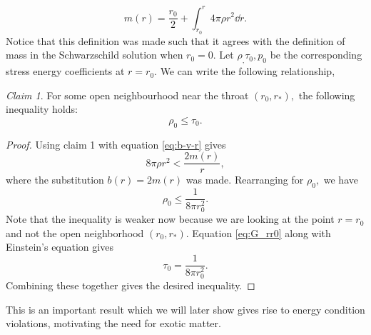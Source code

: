 \documentclass[%
 reprint,
 amsmath,amssymb
 aps,
]{revtex4}
\theoremstyle{remark}
\newtheorem{claim}{Claim}
\begin{document}
\begin{equation}
    m(r) = \frac{r_0}{2} + \int_{r_0}^r 4\pi \rho r^2 \dd{r}.
\end{equation}
Notice that this definition was made such that it agrees with the definition of mass in the Schwarzschild solution when $r_0 = 0.$ Let $\rho_,\tau_0,p_0$ be the corresponding stress energy coefficients at $r=r_0.$ We can write the following relationship,
\begin{claim}
    For some open neighbourhood near the throat $(r_0,r_*),$ the following inequality holds:
    \begin{equation}
        \rho_0 \le \tau_0.
    \end{equation}
    \begin{proof}
        Using claim 1 with equation \ref{eq:b-v-r} gives 
        \begin{equation}
            8\pi \rho r^2 < \frac{2m(r)}{r},
        \end{equation}
        where the substitution $b(r)=2m(r)$ was made. Rearranging for $\rho_0,$ we have 
        \begin{equation}
            \rho_0 \le \frac{1}{8\pi r_0^2}.
        \end{equation}
        Note that the inequality is weaker now because we are looking at the point $r=r_0$ and not the open neighborhood $(r_0,r_*).$ Equation \ref{eq:G_rr0} along with Einstein's equation gives 
        \begin{equation}
            \tau_0 = \frac{1}{8\pi r_0^2}.
        \end{equation}
        Combining these together gives the desired inequality.
    \end{proof}
    This is an important result which we will later show gives rise to energy condition violations, motivating the need for exotic matter.
\end{claim}


\end{document}
